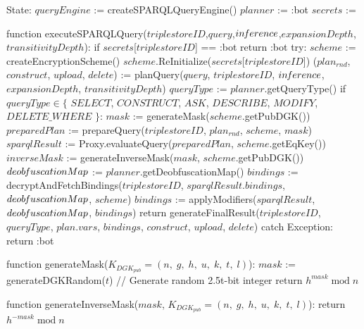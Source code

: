 State:
    $queryEngine$ := createSPARQLQueryEngine()
    $planner$ := :bot
    $secrets$ := {}

function executeSPARQLQuery($triplestoreID$,$query$,$in\textrm{\emph{f}}erence$,$expansionDepth$,$transitivityDepth$):
    if $secrets$[$triplestoreID$] == :bot
        return :bot
    try:
        $scheme$ := createEncryptionScheme()
        $scheme$.ReInitialize($secrets$[$triplestoreID$])
        ($plan_{rnd}$, $construct$, $upload$, $delete$) := planQuery($query$, $triplestoreID$, $in\textrm{\emph{f}}erence$, $expansionDepth$, $transitivityDepth$) 
        $queryType$ := $planner$.getQueryType()
        if $queryType \in \{$ $SELECT$, $CONSTRUCT$, $ASK$, $DESCRIBE$, $MODIFY$, $DELETE\_WHERE$ $\}$:
            $mask$ := generateMask($scheme$.getPubDGK())
            $preparedPlan$ := prepareQuery($triplestoreID$, $plan_{rnd}$, $scheme$, $mask$)
            $sparqlResult$ := Proxy.evaluateQuery($preparedPlan$, $scheme$.getEqKey())
            $inverseMask$ := generateInverseMask($mask$, $scheme$.getPubDGK())
            $deob\textrm{\emph{f}}uscationMap$ := $planner$.getDeobfuscationMap()
            $bindings$ := decryptAndFetchBindings($triplestoreID$, $sparqlResult$.$bindings$, $deob\textrm{\emph{f}}uscationMap$, $scheme$)
            $bindings$ := applyModifiers($sparqlResult$, $deob\textrm{\emph{f}}uscationMap$, $bindings$)
        return generateFinalResult($triplestoreID$, $queryType$, $plan$.$vars$, $bindings$, $construct$, $upload$, $delete$)
    catch Exception:
        return :bot

function generateMask($K_{DGK_{pub}} = (n, \; g, \; h, \; u, \; k, \; t, \; l)$):
    $mask$ := generateDGKRandom($t$) // Generate random 2.5t-bit integer
    return $h^{mask} \; \textrm{mod} \; n$

function generateInverseMask($mask$, $K_{DGK_{pub}} = (n, \; g, \; h, \; u, \; k, \; t, \; l)$):
    return $h^{-mask} \; \textrm{mod} \; n$